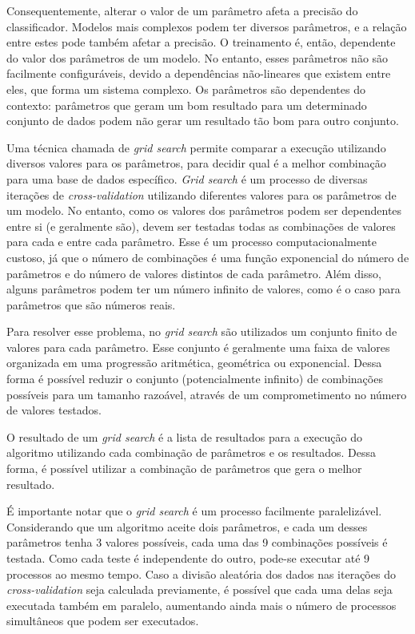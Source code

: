 Consequentemente, alterar o valor de um parâmetro afeta a precisão do classificador. Modelos mais complexos podem ter diversos parâmetros, e a relação entre estes pode também afetar a precisão. O treinamento é, então, dependente do valor dos parâmetros de um modelo. No entanto, esses parâmetros não são facilmente configuráveis, devido a dependências não-lineares que existem entre eles, que forma um sistema complexo. Os parâmetros são dependentes do contexto: parâmetros que geram um bom resultado para um determinado conjunto de dados podem não gerar um resultado tão bom para outro conjunto.

Uma técnica chamada de \emph{grid search} permite comparar a execução utilizando diversos valores para os parâmetros, para decidir qual é a melhor combinação para uma base de dados específico. \emph{Grid search} é um processo de diversas iterações de \emph{cross-validation} utilizando diferentes valores para os parâmetros de um modelo. No entanto, como os valores dos parâmetros podem ser dependentes entre si (e geralmente são), devem ser testadas todas as combinações de valores para cada e entre cada parâmetro. Esse é um processo computacionalmente custoso, já que o número de combinações é uma função exponencial do número de parâmetros e do número de valores distintos de cada parâmetro. Além disso, alguns parâmetros podem ter um número infinito de valores, como é o caso para parâmetros que são números reais.

Para resolver esse problema, no \emph{grid search} são utilizados um conjunto finito de valores para cada parâmetro. Esse conjunto é geralmente uma faixa de valores organizada em uma progressão aritmética, geométrica ou exponencial. Dessa forma é possível reduzir o conjunto (potencialmente infinito) de combinações possíveis para um tamanho razoável, através de um comprometimento no número de valores testados.

O resultado de um \emph{grid search} é a lista de resultados para a execução do algoritmo utilizando cada combinação de parâmetros e os resultados. Dessa forma, é possível utilizar a combinação de parâmetros que gera o melhor resultado.

É importante notar que o \emph{grid search} é um processo facilmente paralelizável. Considerando que um algoritmo aceite dois parâmetros, e cada um desses parâmetros tenha 3 valores possíveis, cada uma das 9 combinações possíveis é testada. Como cada teste é independente do outro, pode-se executar até 9 processos ao mesmo tempo. Caso a divisão aleatória dos dados nas iterações do \emph{cross-validation} seja calculada previamente, é possível que cada uma delas seja executada também em paralelo, aumentando ainda mais o número de processos simultâneos que podem ser executados.

